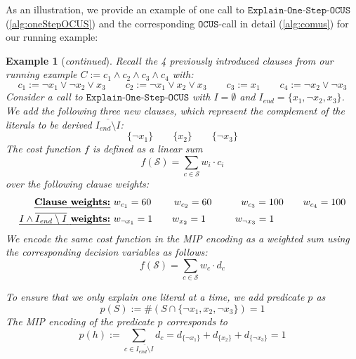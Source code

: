 \documentclass[twoside,11pt]{article}
\newcommand\m[1]{\mathcal{#1}}
\newtheorem{example}{Example}
\newcommand\decisionvariable{{d}}
\newcommand\Iend{\ensuremath{I_\mathit{end} }\xspace}
\newcommand\formularunning{\ensuremath{C }\xspace}
\newcommand\mm[1]{\ensuremath{#1}\xspace}
\newcommand\call[1]{\mm{\texttt{#1}}}
\newcommand\comus{\mm{\call{OCUS}}}
\newcommand\onestepo{\ensuremath{\call{Explain-One-Step-OCUS}}\xspace}
\begin{document}
	
As an illustration, we provide an example of one call to \onestepo (\cref{alg:oneStepOCUS}) and the corresponding \comus-call in detail (\cref{alg:comus}) for our running example:
\begin{example}[\textit{continued}]\label{ex:onestep-ocus}
	Recall the 4 previously introduced clauses from our running example $\formularunning := c_1 \wedge c_2 \wedge c_3 \wedge c_4 $ with:
			\[ c_1 := \lnot x_1 \vee \lnot x_2 \vee x_3 \qquad  c_2 := \lnot x_1 \vee  x_2 \vee x_3 \qquad  c_3 := x_1 \qquad c_4 := \lnot x_2 \vee \lnot x_3 \]
Consider a call to \onestepo with $ I = \emptyset$ and $\Iend = \{x_1, \lnot x_2, x_3\}$. We add the following three new clauses, which represent the complement of the literals to be derived $\overline{\Iend\setminus I}$:
\[ \{\lnot x_1\}\qquad  \{x_2\} \qquad\{\lnot x_3\}\]
The cost function $f$ is defined as a linear sum  
\begin{equation}
	f(\m{S}) = \sum_{c \in \m{S}} w_i\cdot c_i
\end{equation} over the following clause weights:
\begin{align*}
	\text{\textbf{\emph{Clause weights:}}} & \ w_{c_1} = 60 \  \qquad w_{c_2}=60  \qquad  \ \ \ w_{c_3}=100 \qquad w_{c_4}=100 \\
	\text{\textbf{\emph{$I \wedge \overline{\Iend \setminus I}$ weights:}}} & \  w_{\lnot x_1}=1  \qquad w_{ x_2}=1 \ \ \ \qquad w_{\lnot x_3}=1 
\end{align*}
We encode the same cost function in the MIP encoding as a weighted sum using the corresponding decision variables as follows:
\begin{equation}
	f(\m{S}) = \sum_{c \in \m{S}} w_c\cdot d_{c} 
\end{equation}

		To ensure that we only explain one literal at a time, we add predicate $p$ as
		\begin{equation}\label{eq:cost-function}
		p(S) := \# (S\cap \{\lnot x_1, x_2, \lnot x_3\})=1
		\end{equation}
	The MIP encoding of the predicate $p$ corresponds to
		\begin{equation}
		p(h):= \sum_{c \in \overline{\Iend \setminus I}} d_c = \decisionvariable_{\{\lnot x_1\}} + \decisionvariable_{\{x_2\}} + \decisionvariable_{\{\lnot x_3\}} = 1
		\label{eq:exactly-one-constraint}
	\end{equation}		


\end{example}
\end{document}
